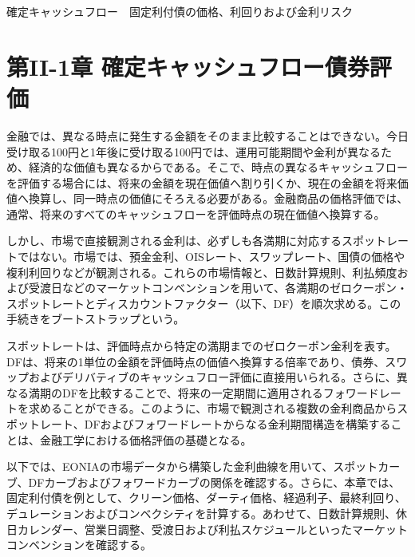 \documentclass[
  letterpaper,
  DIV=11,
  numbers=noendperiod]{scrreprt}
\newenvironment{Shaded}{\begin{snugshade}}{\end{snugshade}}
\newcommand{\AttributeTok}[1]{\textcolor[rgb]{0.40,0.45,0.13}{#1}}
\newcommand{\ConstantTok}[1]{\textcolor[rgb]{0.56,0.35,0.01}{#1}}
\newcommand{\FunctionTok}[1]{\textcolor[rgb]{0.28,0.35,0.67}{#1}}
\newcommand{\NormalTok}[1]{\textcolor[rgb]{0.00,0.23,0.31}{#1}}
\newcommand{\SpecialCharTok}[1]{\textcolor[rgb]{0.37,0.37,0.37}{#1}}
\newcommand{\StringTok}[1]{\textcolor[rgb]{0.13,0.47,0.30}{#1}}
\begin{document}
確定キャッシュフロー　固定利付債の価格、利回りおよび金利リスク

\hfill\break

\chapter{第II-1章
確定キャッシュフロー債券評価}\label{ux7b2cii-1ux7ae0-ux78baux5b9aux30adux30e3ux30c3ux30b7ux30e5ux30d5ux30edux30fcux50b5ux5238ux8a55ux4fa1-1}

金融では、異なる時点に発生する金額をそのまま比較することはできない。今日受け取る100円と1年後に受け取る100円では、運用可能期間や金利が異なるため、経済的な価値も異なるからである。そこで、時点の異なるキャッシュフローを評価する場合には、将来の金額を現在価値へ割り引くか、現在の金額を将来価値へ換算し、同一時点の価値にそろえる必要がある。金融商品の価格評価では、通常、将来のすべてのキャッシュフローを評価時点の現在価値へ換算する。

しかし、市場で直接観測される金利は、必ずしも各満期に対応するスポットレートではない。市場では、預金金利、OISレート、スワップレート、国債の価格や複利利回りなどが観測される。これらの市場情報と、日数計算規則、利払頻度および受渡日などのマーケットコンベンションを用いて、各満期のゼロクーポン・スポットレートとディスカウントファクター（以下、DF）を順次求める。この手続きをブートストラップという。

スポットレートは、評価時点から特定の満期までのゼロクーポン金利を表す。DFは、将来の1単位の金額を評価時点の価値へ換算する倍率であり、債券、スワップおよびデリバティブのキャッシュフロー評価に直接用いられる。さらに、異なる満期のDFを比較することで、将来の一定期間に適用されるフォワードレートを求めることができる。このように、市場で観測される複数の金利商品からスポットレート、DFおよびフォワードレートからなる金利期間構造を構築することは、金融工学における価格評価の基礎となる。

以下では、EONIAの市場データから構築した金利曲線を用いて、スポットカーブ、DFカーブおよびフォワードカーブの関係を確認する。さらに、本章では、固定利付債を例として、クリーン価格、ダーティ価格、経過利子、最終利回り、デュレーションおよびコンベクシティを計算する。あわせて、日数計算規則、休日カレンダー、営業日調整、受渡日および利払スケジュールといったマーケットコンベンションを確認する。

\begin{Shaded}
\end{Shaded}
\end{document}
